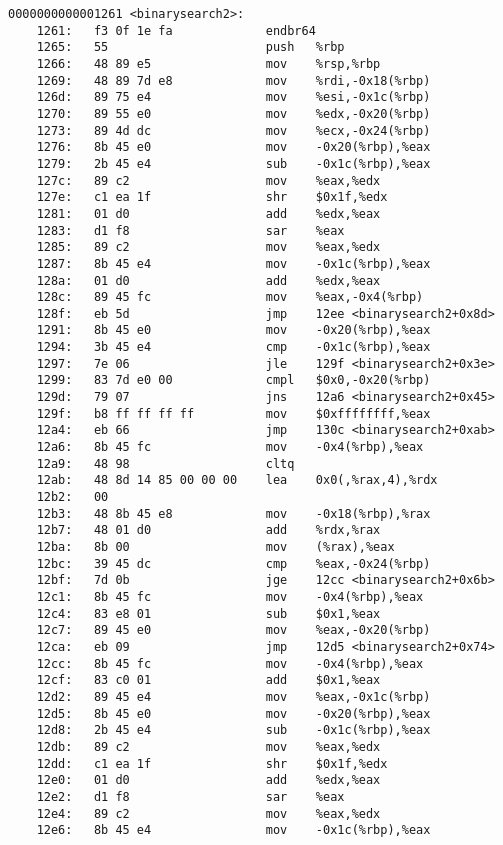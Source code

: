 \begin{mycode}
\begin{verbatim}
0000000000001261 <binarysearch2>:
    1261:	f3 0f 1e fa          	endbr64
    1265:	55                   	push   %rbp
    1266:	48 89 e5             	mov    %rsp,%rbp
    1269:	48 89 7d e8          	mov    %rdi,-0x18(%rbp)
    126d:	89 75 e4             	mov    %esi,-0x1c(%rbp)
    1270:	89 55 e0             	mov    %edx,-0x20(%rbp)
    1273:	89 4d dc             	mov    %ecx,-0x24(%rbp)
    1276:	8b 45 e0             	mov    -0x20(%rbp),%eax
    1279:	2b 45 e4             	sub    -0x1c(%rbp),%eax
    127c:	89 c2                	mov    %eax,%edx
    127e:	c1 ea 1f             	shr    $0x1f,%edx
    1281:	01 d0                	add    %edx,%eax
    1283:	d1 f8                	sar    %eax
    1285:	89 c2                	mov    %eax,%edx
    1287:	8b 45 e4             	mov    -0x1c(%rbp),%eax
    128a:	01 d0                	add    %edx,%eax
    128c:	89 45 fc             	mov    %eax,-0x4(%rbp)
    128f:	eb 5d                	jmp    12ee <binarysearch2+0x8d>
    1291:	8b 45 e0             	mov    -0x20(%rbp),%eax
    1294:	3b 45 e4             	cmp    -0x1c(%rbp),%eax
    1297:	7e 06                	jle    129f <binarysearch2+0x3e>
    1299:	83 7d e0 00          	cmpl   $0x0,-0x20(%rbp)
    129d:	79 07                	jns    12a6 <binarysearch2+0x45>
    129f:	b8 ff ff ff ff       	mov    $0xffffffff,%eax
    12a4:	eb 66                	jmp    130c <binarysearch2+0xab>
    12a6:	8b 45 fc             	mov    -0x4(%rbp),%eax
    12a9:	48 98                	cltq
    12ab:	48 8d 14 85 00 00 00 	lea    0x0(,%rax,4),%rdx
    12b2:	00 
    12b3:	48 8b 45 e8          	mov    -0x18(%rbp),%rax
    12b7:	48 01 d0             	add    %rdx,%rax
    12ba:	8b 00                	mov    (%rax),%eax
    12bc:	39 45 dc             	cmp    %eax,-0x24(%rbp)
    12bf:	7d 0b                	jge    12cc <binarysearch2+0x6b>
    12c1:	8b 45 fc             	mov    -0x4(%rbp),%eax
    12c4:	83 e8 01             	sub    $0x1,%eax
    12c7:	89 45 e0             	mov    %eax,-0x20(%rbp)
    12ca:	eb 09                	jmp    12d5 <binarysearch2+0x74>
    12cc:	8b 45 fc             	mov    -0x4(%rbp),%eax
    12cf:	83 c0 01             	add    $0x1,%eax
    12d2:	89 45 e4             	mov    %eax,-0x1c(%rbp)
    12d5:	8b 45 e0             	mov    -0x20(%rbp),%eax
    12d8:	2b 45 e4             	sub    -0x1c(%rbp),%eax
    12db:	89 c2                	mov    %eax,%edx
    12dd:	c1 ea 1f             	shr    $0x1f,%edx
    12e0:	01 d0                	add    %edx,%eax
    12e2:	d1 f8                	sar    %eax
    12e4:	89 c2                	mov    %eax,%edx
    12e6:	8b 45 e4             	mov    -0x1c(%rbp),%eax

\end{verbatim}
\end{mycode}
